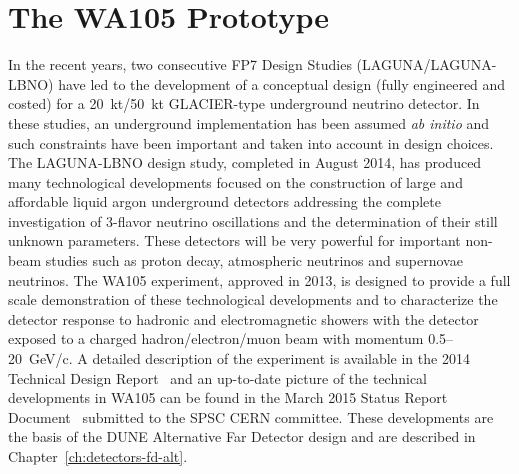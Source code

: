 \section{The WA105 Prototype} 
\label{sec:proto-cern-double}

In the recent years, two consecutive FP7 Design Studies
(LAGUNA/LAGUNA-LBNO) have led to the development of a conceptual
design (fully engineered and costed) for a 20~kt/50~kt GLACIER-type
underground neutrino detector. In these studies, an underground
implementation has been assumed {\it ab initio} and such constraints
have been important and taken into account in design choices. The
LAGUNA-LBNO design study, completed in August 2014, has produced many
technological developments focused on the construction of large and
affordable liquid argon underground detectors addressing the complete
investigation of 3-flavor neutrino oscillations and the determination
of their still unknown parameters. These detectors will be very
powerful for important non-beam studies such as proton decay,
atmospheric neutrinos and supernovae neutrinos. The WA105 experiment,
approved in 2013, is designed to provide a full scale demonstration of
these technological developments and to characterize the detector
response to hadronic and electromagnetic showers with the detector
exposed to a charged hadron/electron/muon beam with momentum
0.5--20~GeV/c. A detailed description of the experiment is available
in the 2014 Technical Design Report~\cite{WA105_TDR} and an up-to-date
picture of the technical developments in WA105 can be found in the
March 2015 Status Report Document~\cite{WA105_SREP} submitted to the
SPSC CERN committee. These developments are the basis of the DUNE
Alternative Far Detector design and are described in
Chapter~\ref{ch:detectors-fd-alt}.

